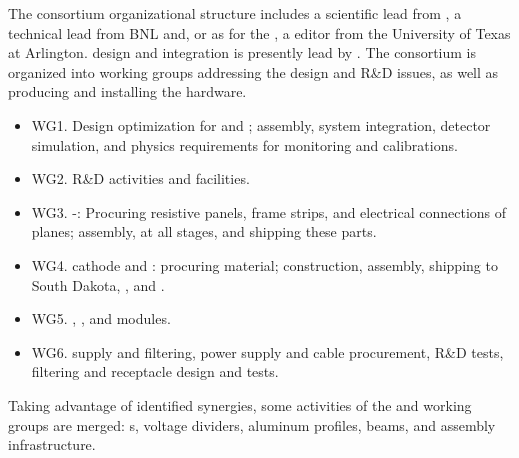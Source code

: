 The consortium organizational structure includes a scientific lead from , a technical lead from BNL and, or as for the , a  editor from the University of Texas at Arlington.   design and integration is presently lead by . 
The consortium is organized into working groups addressing the design and  R\&D issues, as well as producing and installing the hardware.

\begin{itemize}
\item WG1. Design optimization for  and ; assembly, system integration, detector simulation, and physics requirements for monitoring and calibrations. %
\item WG2. R\&D activities and %
facilities. %
\item WG3. -: Procuring resistive panels, frame strips, and electrical connections of planes; assembly,  at all stages, and shipping these parts. %
\item WG4.  cathode and :  procuring material; construction, assembly, shipping to South Dakota, %
, and .%
\item WG5.  , , and %
 modules. %
\item WG6.  supply and filtering,  power supply and cable procurement, R\&D tests, filtering and receptacle design and tests. %
\end{itemize}

Taking advantage of identified synergies, some activities of the  and  working groups are merged:  \fdth{}s, voltage dividers, aluminum profiles,  beams, and assembly infrastructure.

